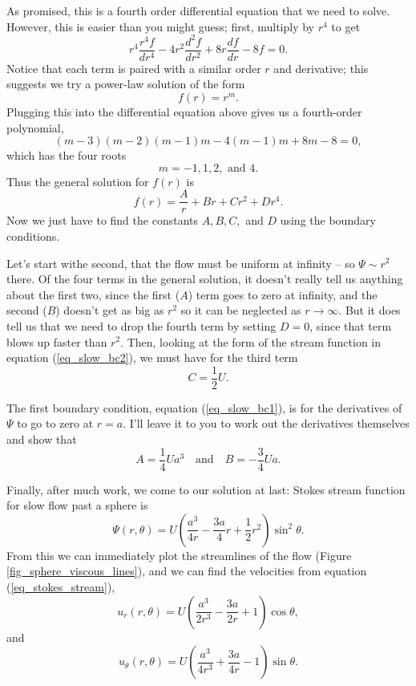 As promised, this is a fourth order differential equation that we need to solve.  However, this is easier than you might guess; first, multiply by $r^4$ to get
\[
r^4 \frac{r^4f}{dr^4} - 4r^2 \frac{d^2f}{dr^2} + 8r \frac{df}{dr} - 8f = 0.
\]
Notice that each term is paired with a similar order $r$ and derivative; this suggests we try a power-law solution of the form 
\[
f(r) = r^m.
\]
Plugging this into the differential equation above gives us a fourth-order polynomial,
\[
(m-3)(m-2)(m-1)m - 4(m-1)m + 8m - 8 = 0,
\]
which has the four roots
\[
m = -1, 1, 2, \text{ and } 4.
\]
Thus the general solution for $f(r)$ is
\begin{equation}
f(r) = \frac{A}{r} + Br + Cr^2 + Dr^4.
\end{equation}
Now we just have to find the constants $A, B, C,$ and $D$ using the boundary conditions.

Let's start withe second, that the flow must be uniform at infinity -- so $\Psi \sim r^2$ there.  Of the four terms in the general solution, it doesn't really tell us anything about the first two, since the first ($A$) term goes to zero at infinity, and the second ($B$) doesn't get as big as $r^2$ so it can be neglected as $r\to\infty$.  But it does tell us that we need to drop the fourth term by setting $D = 0$, since that term blows up faster than $r^2$.  Then, looking at the form of the stream function in equation (\ref{eq_slow_bc2}), we must have for the third term
\[
C = \frac{1}{2}U.
\]

The first boundary condition, equation (\ref{eq_slow_bc1}), is for the derivatives of $\Psi$ to go to zero at $r=a$.  I'll leave it to you to work out the derivatives themselves and show that
\[
A = \frac{1}{4} Ua^3 \quad \text{and} \quad B = -\frac{3}{4} U a.
\]

Finally, after much work, we come to our solution at last:  Stokes stream function for slow flow past a sphere is
\begin{equation}
\boxed{
\Psi(r, \theta) = U \left( \frac{a^3}{4r} - \frac{3a}{4} r + \frac{1}{2} r^2 \right) \sin^2\theta.
}
\end{equation}
From this we can immediately plot the streamlines of the flow (Figure \ref{fig_sphere_viscous_lines}),  and we can find the velocities from equation (\ref{eq_stokes_stream}),
\begin{equation}
\label{eq_sphere_viscous_vel1}
u_r(r, \theta) = U \left( \frac{a^3}{2r^3} - \frac{3a}{2r} + 1 \right) \cos\theta,
\end{equation}
and
\begin{equation}
\label{eq_sphere_viscous_vel2}
u_\theta(r, \theta) = U \left( \frac{a^3}{4r^3} + \frac{3a}{4r} - 1 \right) \sin\theta.
\end{equation}


